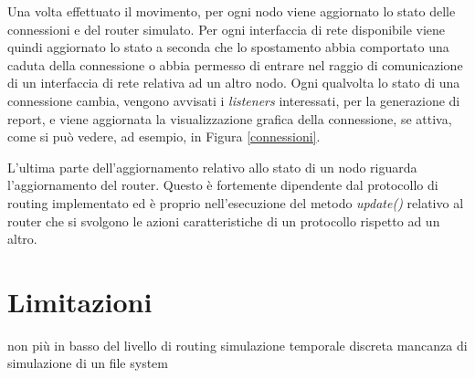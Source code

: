 Una volta effettuato il movimento, per ogni nodo viene aggiornato lo stato delle connessioni e del router simulato. Per ogni interfaccia di rete disponibile viene quindi aggiornato lo stato a seconda che lo spostamento abbia comportato una caduta della connessione o abbia permesso di entrare nel raggio di comunicazione di un interfaccia di rete relativa ad un altro nodo. Ogni qualvolta lo stato di una connessione cambia, vengono avvisati i \textit{listeners} interessati, per la generazione di report, e viene aggiornata la visualizzazione grafica della connessione, se attiva, come si può vedere, ad esempio, in Figura \ref{connessioni}.
\\

L'ultima parte dell'aggiornamento relativo allo stato di un nodo riguarda l'aggiornamento del router. Questo è fortemente dipendente dal protocollo di routing implementato ed è proprio nell'esecuzione del metodo \textit{update()} relativo al router che si svolgono le azioni caratteristiche di un protocollo rispetto ad un altro.

\section{Limitazioni}
non più in basso del livello di routing
simulazione temporale discreta
mancanza di simulazione di un file system


